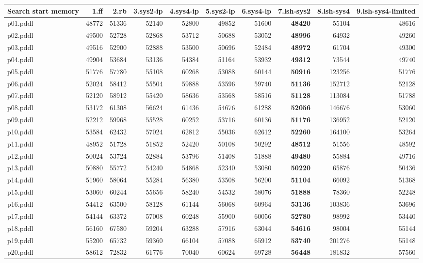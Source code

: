 \documentclass{article}
\begin{document}
\begin{tabular}{@{}lrrrrrrrrr@{}}
Search start memory & 1.ff & 2.rb & 3.sys2-ip & 4.sys4-ip & 5.sys2-lp & 6.sys4-lp & 7.lsh-sys2 & 8.lsh-sys4 & 9.lsh-sys4-limited \\
\midrule
p01.pddl & 48772 & 51336 & 52140 & 52800 & 49852 & 51600 & \textbf{48420} & 55104 & 48616 \\
p02.pddl & 49500 & 52728 & 52868 & 53712 & 50688 & 53052 & \textbf{48996} & 64932 & 49260 \\
p03.pddl & 49516 & 52900 & 52888 & 53500 & 50696 & 52484 & \textbf{48972} & 61704 & 49300 \\
p04.pddl & 49904 & 53684 & 53136 & 54384 & 51164 & 53932 & \textbf{49312} & 73544 & 49740 \\
p05.pddl & 51776 & 57780 & 55108 & 60268 & 53088 & 60144 & \textbf{50916} & 123256 & 51776 \\
p06.pddl & 52024 & 58412 & 55504 & 59888 & 53596 & 59740 & \textbf{51136} & 152712 & 52128 \\
p07.pddl & 52120 & 58912 & 55420 & 58636 & 53568 & 58516 & \textbf{51128} & 113084 & 51788 \\
p08.pddl & 53172 & 61308 & 56624 & 61436 & 54676 & 61288 & \textbf{52056} & 146676 & 53060 \\
p09.pddl & 52212 & 59968 & 55528 & 60252 & 53716 & 60136 & \textbf{51176} & 136952 & 52120 \\
p10.pddl & 53584 & 62432 & 57024 & 62812 & 55036 & 62612 & \textbf{52260} & 164100 & 53264 \\
p11.pddl & 48952 & 51728 & 51852 & 52420 & 50108 & 50292 & \textbf{48512} & 51556 & 48592 \\
p12.pddl & 50024 & 53724 & 52884 & 53796 & 51408 & 51888 & \textbf{49480} & 55884 & 49716 \\
p13.pddl & 50880 & 55772 & 54240 & 54868 & 52340 & 53080 & \textbf{50220} & 65876 & 50436 \\
p14.pddl & 51960 & 58064 & 55284 & 56380 & 53508 & 56200 & \textbf{51104} & 66092 & 51368 \\
p15.pddl & 53060 & 60244 & 55656 & 58240 & 54532 & 58076 & \textbf{51888} & 78360 & 52248 \\
p16.pddl & 54412 & 63500 & 58128 & 61144 & 56068 & 60964 & \textbf{53136} & 103836 & 53696 \\
p17.pddl & 54144 & 63372 & 57008 & 60248 & 55900 & 60056 & \textbf{52780} & 98992 & 53440 \\
p18.pddl & 56160 & 67580 & 59204 & 63288 & 57916 & 63044 & \textbf{54616} & 98004 & 55144 \\
p19.pddl & 55200 & 65732 & 59360 & 66104 & 57088 & 65912 & \textbf{53740} & 201276 & 55148 \\
p20.pddl & 58612 & 72832 & 61776 & 70040 & 60624 & 69728 & \textbf{56448} & 181832 & 57560 \\
\end{tabular}
\end{document}
